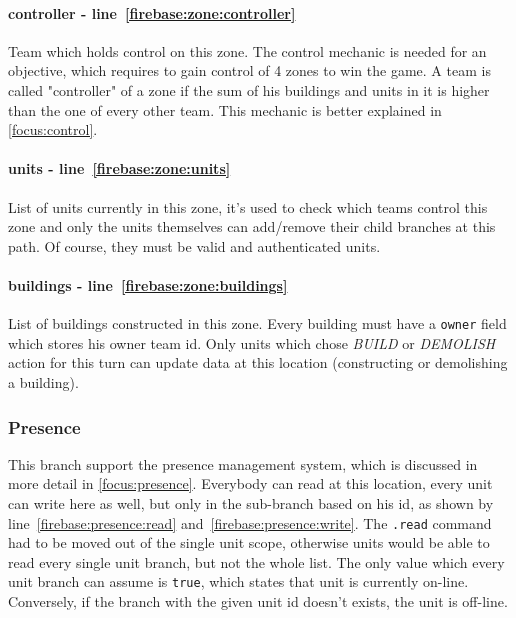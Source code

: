 				\paragraph{controller - line~\ref{firebase:zone:controller}}
				Team which holds control on this zone. The control mechanic is needed for an objective, which requires to gain control of 4 zones to win the game. A team is called "controller" of a zone if the sum of his buildings and units in it is higher than the one of every other team. This mechanic is better explained in \autoref{focus:control}.
				
				\paragraph{units - line~\ref{firebase:zone:units}}
				List of units currently in this zone, it's used to check which teams control this zone and only the units themselves can add/remove their child branches at this path. Of course, they must be valid and authenticated units.
				
				\paragraph{buildings - line~\ref{firebase:zone:buildings}}
				List of buildings constructed in this zone. Every building must have a \lstinline|owner| field which stores his owner team id. Only units which chose \emph{BUILD} or \emph{DEMOLISH} action for this turn can update data at this location (constructing or demolishing a building).
			
			\subsubsection{Presence}\label{model:presence}
		
				
									
				This branch support the presence management system, which is discussed in more detail in \autoref{focus:presence}.
				Everybody can read at this location, every unit can write here as well, but only in the sub-branch based on his id, as shown by line~\ref{firebase:presence:read} and~\ref{firebase:presence:write}.
				The \lstinline|.read| command had to be moved out of the single unit scope, otherwise units would be able to read every single unit branch, but not the whole list.
				The only value which every unit branch can assume is \lstinline|true|, which states that unit is currently on-line. Conversely, if the branch with the given unit id doesn't exists, the unit is off-line.
			
